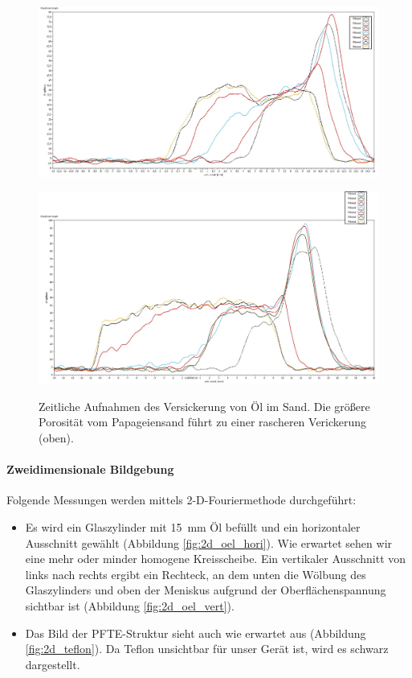 \documentclass[a4paper]{scrartcl} %
\begin{document}
\begin{figure}[htbp]
	{
		\centering
		\includegraphics[width=.8 \linewidth]{./Resources/Teil_3/oeldiff_chinchilla.jpg}
		\label{fig:oeldiff_chinchilla}
	\vspace{1cm}
	
		\centering
		\includegraphics[width=.8 \linewidth]{./Resources/Teil_3/oeldiff_papa.jpg}
		\label{fig:oeldiff_papa}
	}	
		\caption{Zeitliche Aufnahmen des Versickerung von Öl im Sand. Die größere Porosität vom Papageiensand führt zu einer rascheren Verickerung (oben).}
		\label{fig:oel_diff}
	
\end{figure}

\paragraph{Zweidimensionale Bildgebung}

Folgende Messungen werden mittels 2-D-Fouriermethode durchgeführt:

\begin{itemize}
	\item Es wird ein Glaszylinder mit \SI{15}{mm} Öl befüllt und ein horizontaler Ausschnitt gewählt (Abbildung \ref{fig:2d_oel_hori}). Wie erwartet sehen wir eine mehr oder minder homogene Kreisscheibe. Ein vertikaler Ausschnitt von links nach rechts ergibt ein Rechteck, an dem unten die Wölbung des Glaszylinders und oben der Meniskus aufgrund der Oberflächenspannung sichtbar ist (Abbildung \ref{fig:2d_oel_vert}).
	\item Das Bild der PFTE-Struktur sieht auch wie erwartet aus (Abbildung \ref{fig:2d_teflon}). Da Teflon unsichtbar für unser Gerät ist, wird es schwarz dargestellt.
\end{itemize}
\end{document}

